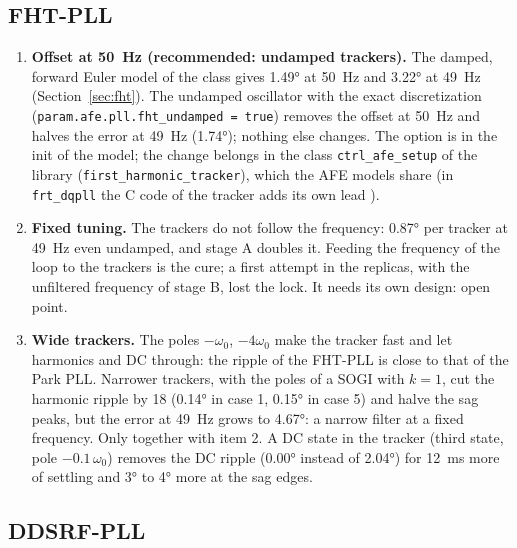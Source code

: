 \documentclass[11pt,a4paper]{scrartcl}
\newcommand{\code}[1]{\texttt{#1}}
\begin{document}
\begin{onehalfspace}
\subsection{FHT-PLL}
\label{sec:critfht}

\begin{enumerate}
	\item \textbf{Offset at \SI{50}{\hertz} (recommended: undamped trackers).} The damped, forward Euler model of the class gives \ang{1.49} at \SI{50}{\hertz} and \ang{3.22} at \SI{49}{\hertz} (Section~\ref{sec:fht}). The undamped oscillator with the exact discretization (\code{param.afe.pll.fht\_undamped = true}) removes the offset at \SI{50}{\hertz} and halves the error at \SI{49}{\hertz} (\ang{1.74}); nothing else changes. The option is in the init of the model; the change belongs in the class \code{ctrl\_afe\_setup} of the library (\code{first\_harmonic\_tracker}), which the AFE models share (in \code{frt\_dqpll} the C code of the tracker adds its own lead \cite{note_3ph}).
	\item \textbf{Fixed tuning.} The trackers do not follow the frequency: \ang{0.87} per tracker at \SI{49}{\hertz} even undamped, and stage A doubles it. Feeding the frequency of the loop to the trackers is the cure; a first attempt in the replicas, with the unfiltered frequency of stage B, lost the lock. It needs its own design: open point.
	\item \textbf{Wide trackers.} The poles $-\omega_0$, $-4\omega_0$ make the tracker fast and let harmonics and DC through: the ripple of the FHT-PLL is close to that of the Park PLL. Narrower trackers, with the poles of a SOGI with $k = 1$, cut the harmonic ripple by \num{18} (\ang{0.14} in case 1, \ang{0.15} in case 5) and halve the sag peaks, but the error at \SI{49}{\hertz} grows to \ang{4.67}: a narrow filter at a fixed frequency. Only together with item 2. A DC state in the tracker (third state, pole $-0.1\,\omega_0$) removes the DC ripple (\ang{0.00} instead of \ang{2.04}) for \SI{12}{\milli\second} more of settling and \ang{3} to \ang{4} more at the sag edges.
\end{enumerate}

\subsection{DDSRF-PLL}
\label{sec:critddsrf}


\end{onehalfspace}
\end{document}

